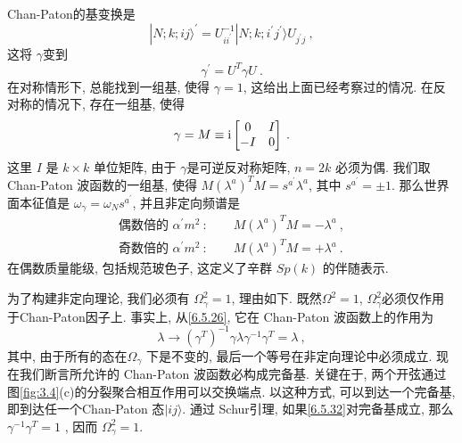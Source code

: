 Chan-Paton的基变换是
\begin{equation}
	|N ; k ; i j\rangle^{\prime}=U_{i i^{\prime}}^{-1} |N ; k ; i^{\prime} j^{\prime}\rangle U_{j^{\prime} j} \:, \label{6.5.28}
\end{equation}
这将 $\gamma$变到
\begin{equation}
	\gamma^{\prime}=U^{T} \gamma U \:. \label{6.5.29}
\end{equation}
在对称情形下, 总能找到一组基, 使得 $\gamma=1$, 这给出上面已经考察过的情况. 在反对称的情况下, 存在一组基, 使得
\begin{equation}
	\gamma=M \equiv \mathrm{i}\begin{bmatrix}
		0 & I \\
		-I & 0
	\end{bmatrix} \:. \label{6.5.30}
\end{equation}
这里 $I$ 是 $k \times k$ 单位矩阵, 由于  $\gamma$是可逆反对称矩阵, $n=2 k$ 必须为偶. 我们取Chan-Paton 波函数的一组基, 
使得 $M(\lambda^{a})^{T} M=s^{a^{\prime}} \lambda^{a}$, 其中 $s^{a^{\prime}}=\pm 1$. 
那么世界面本征值是 $\omega_{\gamma}=\omega_{N} s^{a^{\prime}}$, 并且非定向频谱是
\begin{subequations} \label{6.5.31}
\begin{align}
\text{偶数倍的 }\alpha^{\prime} m^{2} \:: \qquad   M(\lambda^{a})^{T} M=-\lambda^{a} \:, \label{6.5.31a} \\
\text{奇数倍的 }\alpha^{\prime} m^{2} \:: \qquad   M(\lambda^{a})^{T} M=+\lambda^{a} \:. \label{6.5.31b}
\end{align}
\end{subequations}
在偶数质量能级, 包括规范玻色子, 这定义了辛群 $S p(k)$ 的伴随表示.

为了构建非定向理论, 我们必须有 $\Omega_{\gamma}^{2}=1$, 理由如下. 既然$\Omega^{2}=1$, 
$\Omega_{\gamma}^{2}$必须仅作用于Chan-Paton因子上. 事实上, 从\eqref{6.5.26}, 它在 Chan-Paton 波函数上的作用为
\begin{equation}
	\lambda \rightarrow (\gamma^{T})^{-1} \gamma \lambda \gamma^{-1} \gamma^{T}=\lambda \:, \label{6.5.32}
\end{equation}
其中, 由于所有的态在$\Omega_{\gamma}$ 下是不变的, 最后一个等号在非定向理论中必须成立. 现在我们断言所允许的 Chan-Paton 波函数必构成完备基. 
关键在于, 两个开弦通过图\ref{fig:3.4}(c)的分裂聚合相互作用可以交换端点. 以这种方式, 可以到达一个完备基, 即到达任一个Chan-Paton 态$|i j\rangle$. 通过 Schur引理, 如果\eqref{6.5.32}对完备基成立, 那么 $\gamma^{-1} \gamma^{T}=1$ , 因而 $\Omega_{\gamma}^{2}=1$.

